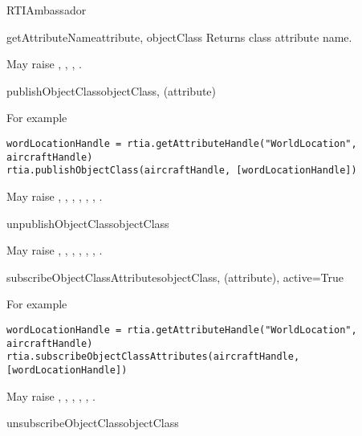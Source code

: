 \begin{classdesc}{RTIAmbassador}{}
\begin{methoddesc}{getAttributeName}{attribute, objectClass}
Returns class attribute name.

May raise
,
,
,
.
\end{methoddesc}

\begin{methoddesc}{publishObjectClass}{objectClass, (attribute)}

For example
\begin{verbatim} 
wordLocationHandle = rtia.getAttributeHandle("WorldLocation", aircraftHandle)
rtia.publishObjectClass(aircraftHandle, [wordLocationHandle])
\end{verbatim}

May raise
,
,
,
,
,
,
.
\end{methoddesc}

\begin{methoddesc}{unpublishObjectClass}{objectClass}

May raise
,
,
,
,
,
,
.
\end{methoddesc}

\begin{methoddesc}{subscribeObjectClassAttributes}{objectClass, (attribute), active=True}

For example
\begin{verbatim} 
wordLocationHandle = rtia.getAttributeHandle("WorldLocation", aircraftHandle)
rtia.subscribeObjectClassAttributes(aircraftHandle, [wordLocationHandle])
\end{verbatim}

May raise
,
,
,
,
,
.
\end{methoddesc}

\begin{methoddesc}{unsubscribeObjectClass}{objectClass}


\end{methoddesc}
\end{classdesc}
